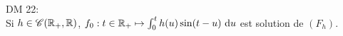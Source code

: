 DM 22: \\
Si $h \in \mathscr{C}(\mathbb{R}_+, \mathbb{R})$, $f_0 : t \in \mathbb{R}_+ \mapsto \int_{0}^{t} h(u) \sin(t-u)\ \mathrm{d} u$ est solution de $(F_h)$.